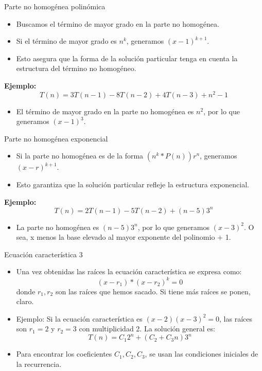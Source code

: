 \documentclass[aspectratio=169]{beamer}
\begin{document}
\begin{frame}{Parte no homogénea polinómica}
\begin{itemize}
    \item Buscamos el término de mayor grado en la parte no homogénea.
    \item Si el término de mayor grado es \( n^k \), generamos \( (x - 1)^{k+1} \).
    \item Esto asegura que la forma de la solución particular tenga en cuenta la estructura del término no homogéneo.
\end{itemize}

\textbf{Ejemplo:}
\[
T(n) = 3T(n-1) - 8T(n-2) + 4T(n-3) + n^2 - 1
\]
\begin{itemize}
    \item El término de mayor grado en la parte no homogénea es \( n^2 \), por lo que generamos \( (x - 1)^3 \).
\end{itemize}
\end{frame}

\begin{frame}{Parte no homogénea exponencial}
\begin{itemize}
    \item Si la parte no homogénea es de la forma \( (n^k * P(n))r^n \), generamos \( (x - r)^{k+1} \).
    \item Esto garantiza que la solución particular refleje la estructura exponencial.
\end{itemize}

\textbf{Ejemplo:}
\[
T(n) = 2T(n-1) - 5T(n-2) + (n-5)3^n
\]
\begin{itemize}
    \item La parte no homogénea es \( (n-5)3^n \), por lo que generamos \( (x - 3)^2 \). O sea, x menos la base elevado al mayor exponente del polinomio + 1.
\end{itemize}
\end{frame}


\begin{frame}{Ecuación característica 3}
\begin{itemize}
    \item Una vez obtenidas las raíces la ecuación característica se expresa como:
    \[
    (x-r_1)*(x-r_2)^k = 0 
    \]
    donde \( r_1, r_2 \) son las raíces que hemos sacado. Si tiene más raíces se ponen, claro.
    
    \item {Ejemplo:} Si la ecuación característica es \( (x-2)(x-3)^2 = 0 \), las raíces son \( r_1 = 2 \) y \( r_2 = 3 \) con multiplicidad 2. La solución general es:
        \[
        T(n) = C_1 2^n + (C_2 + C_3n) 3^n
        \]
    \item Para encontrar los coeficientes \( C_1, C_2, C_3 \), se usan las condiciones iniciales de la recurrencia.
\end{itemize}
\end{frame}
\end{document}
